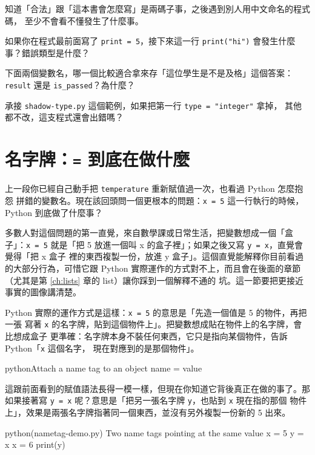 知道「合法」跟「這本書會怎麼寫」是兩碼子事，之後遇到別人用中文命名的程式碼，
至少不會看不懂發生了什麼事。

\begin{drills}[label=drills:naming-practices]
\item 如果你在程式最前面寫了 \texttt{print = 5}，接下來這一行 \texttt{print("hi")}
會發生什麼事？錯誤類型是什麼？
\item 下面兩個變數名，哪一個比較適合拿來存「這位學生是不是及格」這個答案：
\texttt{result} 還是 \texttt{is\_passed}？為什麼？
\item 承接 \texttt{shadow-type.py} 這個範例，如果把第一行 \texttt{type = "integer"} 拿掉，
其他都不改，這支程式還會出錯嗎？
\end{drills}

\section{名字牌：\texttt{=} 到底在做什麼}
\label{sec:name-tags}

上一段你已經自己動手把 \texttt{temperature} 重新賦值過一次，也看過 Python 怎麼抱怨
拼錯的變數名。現在該回頭問一個更根本的問題：\texttt{x = 5} 這一行執行的時候，Python
到底做了什麼事？

多數人對這個問題的第一直覺，來自數學課或日常生活，把變數想成一個「盒子」：\texttt{x = 5}
就是「把 5 放進一個叫 x 的盒子裡」；如果之後又寫 \texttt{y = x}，直覺會覺得「把 x 盒子
裡的東西複製一份，放進 y 盒子」。這個直覺能解釋你目前看過的大部分行為，可惜它跟 Python
實際運作的方式對不上，而且會在後面的章節（尤其是第 \ref{ch:lists} 章的 list）讓你踩到一個解釋不通的
坑。這一節要把更接近事實的圖像講清楚。

Python 實際的運作方式是這樣：\texttt{x = 5} 的意思是「先造一個值是 5 的物件，再把一張
寫著 \texttt{x} 的名字牌，貼到這個物件上」。把變數想成貼在物件上的名字牌，會比想成盒子
更準確：名字牌本身不裝任何東西，它只是指向某個物件，告訴 Python「\texttt{x} 這個名字，
現在對應到的是那個物件」。

\begin{code}{python}{Attach a name tag to an object}
name = value
\end{code}

這跟前面看到的賦值語法長得一模一樣，但現在你知道它背後真正在做的事了。那如果接著寫
\texttt{y = x} 呢？意思是「把另一張名字牌 \texttt{y}，也貼到 \texttt{x} 現在指的那個
物件上」，效果是兩張名字牌指著同一個東西，並沒有另外複製一份新的 5 出來。

\begin{example}{python}{(nametag-demo.py) Two name tags pointing at the same value}
x = 5
y = x
x = 6
print(y)
\end{example}

